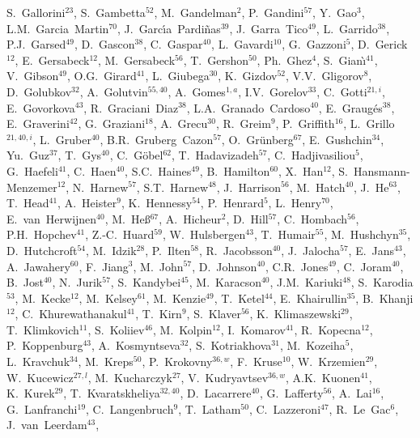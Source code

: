 \documentclass[12pt,a4paper]{article}
\begin{document}
\begin{flushleft}
S.~Gallorini$^{23}$,
S.~Gambetta$^{52}$,
M.~Gandelman$^{2}$,
P.~Gandini$^{57}$,
Y.~Gao$^{3}$,
L.M.~Garcia~Martin$^{70}$,
J.~Garc{\'\i}a~Pardi{\~n}as$^{39}$,
J.~Garra~Tico$^{49}$,
L.~Garrido$^{38}$,
P.J.~Garsed$^{49}$,
D.~Gascon$^{38}$,
C.~Gaspar$^{40}$,
L.~Gavardi$^{10}$,
G.~Gazzoni$^{5}$,
D.~Gerick$^{12}$,
E.~Gersabeck$^{12}$,
M.~Gersabeck$^{56}$,
T.~Gershon$^{50}$,
Ph.~Ghez$^{4}$,
S.~Gian{\`\i}$^{41}$,
V.~Gibson$^{49}$,
O.G.~Girard$^{41}$,
L.~Giubega$^{30}$,
K.~Gizdov$^{52}$,
V.V.~Gligorov$^{8}$,
D.~Golubkov$^{32}$,
A.~Golutvin$^{55,40}$,
A.~Gomes$^{1,a}$,
I.V.~Gorelov$^{33}$,
C.~Gotti$^{21,i}$,
E.~Govorkova$^{43}$,
R.~Graciani~Diaz$^{38}$,
L.A.~Granado~Cardoso$^{40}$,
E.~Graug{\'e}s$^{38}$,
E.~Graverini$^{42}$,
G.~Graziani$^{18}$,
A.~Grecu$^{30}$,
R.~Greim$^{9}$,
P.~Griffith$^{16}$,
L.~Grillo$^{21,40,i}$,
L.~Gruber$^{40}$,
B.R.~Gruberg~Cazon$^{57}$,
O.~Gr{\"u}nberg$^{67}$,
E.~Gushchin$^{34}$,
Yu.~Guz$^{37}$,
T.~Gys$^{40}$,
C.~G{\"o}bel$^{62}$,
T.~Hadavizadeh$^{57}$,
C.~Hadjivasiliou$^{5}$,
G.~Haefeli$^{41}$,
C.~Haen$^{40}$,
S.C.~Haines$^{49}$,
B.~Hamilton$^{60}$,
X.~Han$^{12}$,
S.~Hansmann-Menzemer$^{12}$,
N.~Harnew$^{57}$,
S.T.~Harnew$^{48}$,
J.~Harrison$^{56}$,
M.~Hatch$^{40}$,
J.~He$^{63}$,
T.~Head$^{41}$,
A.~Heister$^{9}$,
K.~Hennessy$^{54}$,
P.~Henrard$^{5}$,
L.~Henry$^{70}$,
E.~van~Herwijnen$^{40}$,
M.~He{\ss}$^{67}$,
A.~Hicheur$^{2}$,
D.~Hill$^{57}$,
C.~Hombach$^{56}$,
P.H.~Hopchev$^{41}$,
Z.-C.~Huard$^{59}$,
W.~Hulsbergen$^{43}$,
T.~Humair$^{55}$,
M.~Hushchyn$^{35}$,
D.~Hutchcroft$^{54}$,
M.~Idzik$^{28}$,
P.~Ilten$^{58}$,
R.~Jacobsson$^{40}$,
J.~Jalocha$^{57}$,
E.~Jans$^{43}$,
A.~Jawahery$^{60}$,
F.~Jiang$^{3}$,
M.~John$^{57}$,
D.~Johnson$^{40}$,
C.R.~Jones$^{49}$,
C.~Joram$^{40}$,
B.~Jost$^{40}$,
N.~Jurik$^{57}$,
S.~Kandybei$^{45}$,
M.~Karacson$^{40}$,
J.M.~Kariuki$^{48}$,
S.~Karodia$^{53}$,
M.~Kecke$^{12}$,
M.~Kelsey$^{61}$,
M.~Kenzie$^{49}$,
T.~Ketel$^{44}$,
E.~Khairullin$^{35}$,
B.~Khanji$^{12}$,
C.~Khurewathanakul$^{41}$,
T.~Kirn$^{9}$,
S.~Klaver$^{56}$,
K.~Klimaszewski$^{29}$,
T.~Klimkovich$^{11}$,
S.~Koliiev$^{46}$,
M.~Kolpin$^{12}$,
I.~Komarov$^{41}$,
R.~Kopecna$^{12}$,
P.~Koppenburg$^{43}$,
A.~Kosmyntseva$^{32}$,
S.~Kotriakhova$^{31}$,
M.~Kozeiha$^{5}$,
L.~Kravchuk$^{34}$,
M.~Kreps$^{50}$,
P.~Krokovny$^{36,w}$,
F.~Kruse$^{10}$,
W.~Krzemien$^{29}$,
W.~Kucewicz$^{27,l}$,
M.~Kucharczyk$^{27}$,
V.~Kudryavtsev$^{36,w}$,
A.K.~Kuonen$^{41}$,
K.~Kurek$^{29}$,
T.~Kvaratskheliya$^{32,40}$,
D.~Lacarrere$^{40}$,
G.~Lafferty$^{56}$,
A.~Lai$^{16}$,
G.~Lanfranchi$^{19}$,
C.~Langenbruch$^{9}$,
T.~Latham$^{50}$,
C.~Lazzeroni$^{47}$,
R.~Le~Gac$^{6}$,
J.~van~Leerdam$^{43}$,

\end{flushleft}
\end{document}
